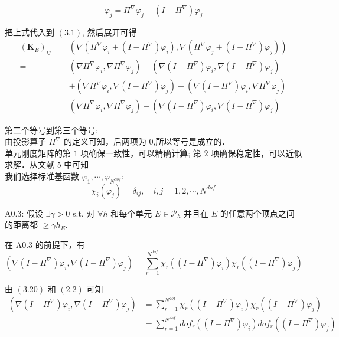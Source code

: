 \begin{equation*} 
\varphi_j = \Pi^{\nabla} \varphi_j + (I-\Pi^{\nabla})\varphi_j
\end{equation*}

把上式代入到 $(3.1)$, 然后展开可得 \\
\begin{equation*}
\begin{aligned}
(\mathbf K_{E})_{i j} = & (\nabla(\Pi^{\nabla} \varphi_i + (I-\Pi^{\nabla})\varphi_i),\nabla(\Pi^{\nabla} \varphi_j + (I-\Pi^{\nabla})\varphi_j)) \\
=& (\nabla \Pi^{\nabla} \varphi_i, \nabla \Pi^{\nabla} \varphi_j) + (\nabla(I-\Pi^{\nabla})\varphi_i,\nabla(I-\Pi^{\nabla})\varphi_j)\\
& + (\nabla \Pi^{\nabla} \varphi_i,\nabla(I-\Pi^{\nabla})\varphi_j)+(\nabla(I-\Pi^{\nabla})\varphi_i,\nabla \Pi^{\nabla} \varphi_j)\\ 
= &(\nabla \Pi^{\nabla} \varphi_i, \nabla \Pi^{\nabla} \varphi_j) + (\nabla(I-\Pi^{\nabla})\varphi_i,\nabla(I-\Pi^{\nabla})\varphi_j)
\end{aligned}
\end{equation*}

第二个等号到第三个等号: \\

由投影算子 $\Pi^{\nabla}$ 的定义可知，后两项为 $0$,所以等号是成立的．\\

单元刚度矩阵的第 $1$ 项确保一致性，可以精确计算; 第 $2$ 项确保稳定性，可以近似求解．从文献 $5$ 中可知\\

我们选择标准基函数 $\varphi_1,\cdots,\varphi_{N^{dof}}$: \\
\begin{equation}
\chi_i(\varphi_j) = \delta_{ij},\quad i,j = 1,2,\cdots,N^{dof}
\end{equation}

A0.3: 假设 $\exists \gamma > 0$ s.t. 对 $\forall h$ 和每个单元 $E \in \mathcal{P}_h$ 并且在 $E$ 的任意两个顶点之间的距离都 $\ge \gamma h_E$.

在 A0.3 的前提下，有 \\
\begin{equation*}
(\nabla(I-\Pi^{\nabla})\varphi_i,\nabla(I-\Pi^{\nabla})\varphi_j) = \sum_{r = 1}^{N^{dof}} \chi_r((I-\Pi^{\nabla})\varphi_i) \chi_r((I-\Pi^{\nabla})\varphi_j)
\end{equation*}

由 $(3.20)$ 和 $(2.2)$ 可知 \\
\begin{equation}
\begin{aligned}
(\nabla(I-\Pi^{\nabla})\varphi_i,\nabla(I-\Pi^{\nabla})\varphi_j) & = \sum_{r = 1}^{N^{dof}} \chi_r((I-\Pi^{\nabla})\varphi_i) \chi_r((I-\Pi^{\nabla})\varphi_j) \\
& = \sum_{r = 1}^{N^{dof}} dof_r((I-\Pi^{\nabla})\varphi_i) dof_r((I-\Pi^{\nabla})\varphi_j) \\
\end{aligned}
\end{equation}

